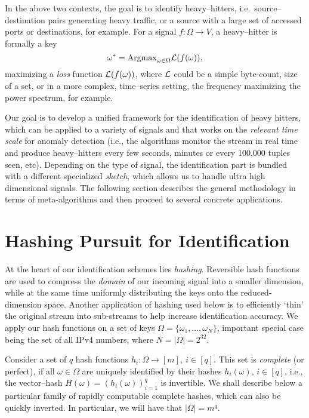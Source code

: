 \documentclass[10pt, conference, letterpaper,onecolumn]{IEEEtranv1.8}
\theoremstyle{plain}\newtheorem{thm}{Theorem}\newtheorem{lem}{Lemma}
\theoremstyle{definition}
\begin{document}
In the above two contexts, the goal is to identify heavy--hitters, i.e.\ source--destination pairs generating heavy traffic, or a source 
with a large set of accessed ports or destinations, for example.  For a signal $f:\Omega\to V$, a heavy--hitter is formally
a key 
$$
\omega^*  = {\rm Argmax}_{\omega\in \Omega} {\cal L}(f(\omega)),
$$
maximizing a {\em loss} function ${\cal L}(f(\omega))$, where ${\cal L}$ could be a simple byte-count, size of a set, or 
in a more complex, time--series setting, the frequency maximizing the power spectrum, for example.

Our goal is to develop a unified framework for the identification of heavy hitters, which can be applied to a variety of signals and
that works on the {\em relevant time scale} for anomaly detection (i.e., the algorithms monitor the stream in real time 
and produce heavy--hitters every few seconds, minutes or every 100,000 tuples seen, etc). 
Depending on the type of signal, the identification part is bundled with a different specialized {\em sketch}, which 
allows us to handle ultra high dimensional signals. The following section describes the general methodology in terms of
meta-algorithms and then proceed to several concrete applications. 

\section{Hashing Pursuit for Identification}
\label{sec:hash-ident}

At the heart of our identification schemes lies \emph{hashing}.  Reversible hash functions are used to compress the 
\emph{domain} of our incoming signal into a smaller dimension, while at the same time uniformly distributing the 
keys onto the reduced-dimension space. Another application of hashing used below is to efficiently `thin' the 
original stream into sub-streams to help increase identification accuracy.
We apply our hash functions on a set of keys $\Omega = \{ \omega_1,\ldots, \omega_N\}$, important 
special case being the set of all IPv4 numbers, where $N= |\Omega| =2^{32}$.


\smallskip
{}
Consider a set of $q$
hash functions $h_i:\Omega \to [m],\ i \in [q]$. This set is {\em complete} (or perfect),
if all $\omega\in\Omega$ are uniquely identified by their hashes $h_i(\omega)$, $i\in[q]$, i.e.,
the vector--hash $H(\omega) = (h_i(\omega))_{i=1}^q$ is invertible.  We shall describe below a particular family of
rapidly computable complete hashes, which can also be quickly inverted. In particular, we will have that
$|\Omega| = m^q$.
\end{document}
